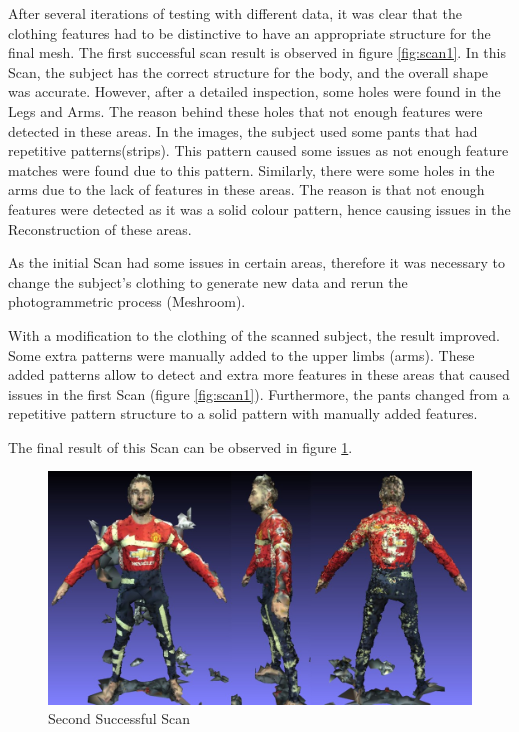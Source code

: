 \documentclass[12pt]{report}
\begin{document}
\newpage
After several iterations of testing with different data, it was clear that the clothing features had to be distinctive to have an appropriate structure for the final mesh.
The first successful scan result is observed in figure \ref{fig:scan1}.
In this Scan, the subject has the correct structure for the body, and the overall shape was accurate. However, after a detailed inspection, some holes were found in the Legs and Arms.
The reason behind these holes that not enough features were detected in these areas. In the images, the subject used some pants that had repetitive patterns(strips). 
This pattern caused some issues as not enough feature matches were found due to this pattern. 
Similarly, there were some holes in the arms due to the lack of features in these areas. The reason is that not enough features were detected as it was a solid colour pattern, hence causing issues in the Reconstruction of these areas. 

As the initial Scan had some issues in certain areas, therefore it was necessary to change the subject's clothing to generate new data and rerun the photogrammetric process (Meshroom). 

With a modification to the clothing of the scanned subject, the result improved.
Some extra patterns were manually added to the upper limbs (arms). These added patterns allow to detect and extra more features in these areas that caused issues in the first Scan (figure \ref{fig:scan1}).
Furthermore, the pants changed from a repetitive pattern structure to a solid pattern with manually added features. 

The final result of this Scan can be observed in figure \ref{fig:scan2}.
\begin{figure}[H]%
  \centering
 \includegraphics[width=1\textwidth]{scan2.png}
\caption{Second Successful Scan}
\label{fig:scan2} 
\end{figure}
\end{document}
